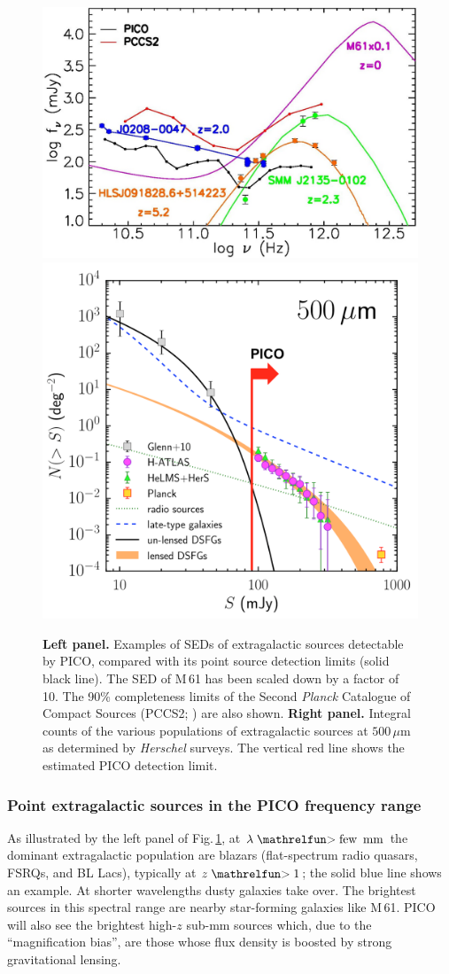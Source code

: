 \documentclass[PICOReport.tex]{subfiles}
\begin{document}
\begin{figure}
\begin{center}
\includegraphics[width=0.48\columnwidth, trim={0 0 0 0cm}, clip]{images/fig_SED3_PICO.jpg}
\includegraphics[width=0.48\columnwidth, height=5.5truecm, trim={0 0 0 0cm}, clip]{images/NgtF_500micron.png}
\caption{\textbf{Left panel.} Examples of SEDs of extragalactic sources detectable by PICO,
compared with its point source detection limits (solid black line). The SED of M\,61 has been scaled down by a
factor of 10. The 90\% completeness limits of the Second \textit{Planck} Catalogue of Compact Sources (PCCS2; \cite{PCCS2})
are also shown.  \textbf{Right panel.} Integral counts of the various populations of extragalactic sources at
$500\,\mu$m as determined by \textit{Herschel} surveys. The vertical red line shows the estimated PICO detection limit.}
\label{fig:SED3}
\end{center}
\end{figure}

\subsubsection{Point extragalactic sources in the PICO frequency range}

As illustrated by the left panel of Fig.\,\ref{fig:SED3}, at $\lambda \simgt
\hbox{few\, mm}$ the  dominant extragalactic population are blazars
(flat-spectrum radio quasars, FSRQs, and BL Lacs), typically at $z\simgt 1$;
the solid blue line shows an example. At shorter wavelengths dusty galaxies
take over. The brightest sources in this spectral range are nearby
star-forming galaxies like M\,61. PICO will also see the brightest high-$z$
sub-mm sources which, due to the ``magnification bias'', are those whose flux
density is boosted by strong gravitational lensing.
\end{document}
